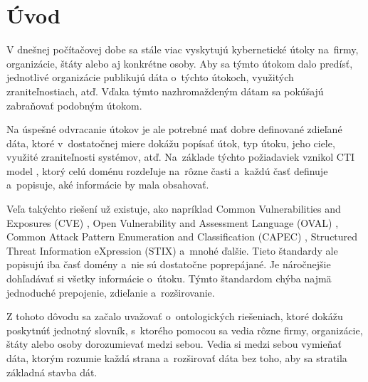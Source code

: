 \documentclass[12pt, a4paper, oneside]{book}
\begin{document}
\tableofcontents

\mainmatter

\chapter{Úvod}\label{chap:intro}

V dnešnej počítačovej dobe sa stále viac vyskytujú kybernetické útoky na~firmy, organizácie, štáty alebo aj konkrétne osoby. Aby sa týmto útokom dalo predísť, jednotlivé organizácie publikujú dáta o~týchto útokoch, využitých zraniteľnostiach, atď. Vďaka týmto nazhromaždeným dátam sa pokúšajú zabraňovať podobným útokom. 


Na úspešné odvracanie útokov je ale potrebné mať dobre definované zdieľané dáta, ktoré v~dostatočnej miere dokážu popísať útok, typ útoku, jeho ciele, využité zraniteľnosti systémov, atď. Na~základe týchto požiadaviek vznikol CTI model \citep{MavroeidisB17}, ktorý celú doménu rozdeľuje na~rôzne časti a~každú časť definuje a~popisuje, aké informácie by mala obsahovať. 


Veľa takýchto riešení už existuje, ako napríklad Common Vulnerabilities and Exposures (CVE) \citep{cve}, Open Vulnerability and Assessment Language (OVAL) \citep{oval}, Common Attack Pattern Enumeration and Classification (CAPEC) \citep{capec}, Structured Threat Information eXpression (STIX) \citep{stix} a~mnohé ďalšie. Tieto štandardy ale popisujú iba časť domény a~nie sú dostatočne poprepájané. Je náročnejšie dohľadávať si všetky informácie o~útoku. Týmto štandardom chýba najmä jednoduché prepojenie, zdieľanie a~rozširovanie.



Z tohoto dôvodu sa začalo uvažovať o~ontologických riešeniach, ktoré dokážu poskytnúť jednotný slovník, s~ktorého pomocou sa vedia rôzne firmy, organizácie, štáty alebo osoby dorozumievať medzi sebou. Vedia si medzi sebou vymieňať dáta, ktorým rozumie každá strana a~rozširovať dáta bez toho, aby sa stratila základná stavba dát.
\end{document}

